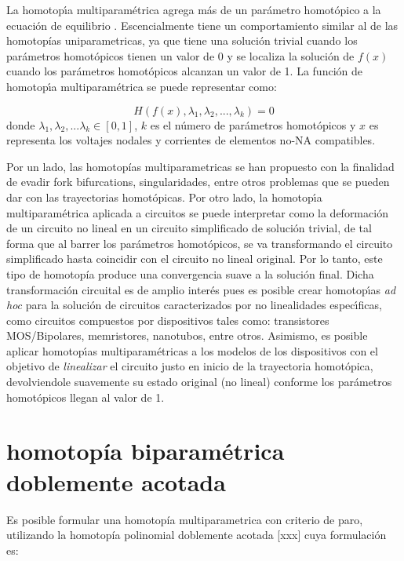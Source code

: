 \documentclass[conference,letterpaper,twocolumn]{IEEEtran}
\begin{document}
La homotop\'{\i}a multiparam\'etrica agrega m\'as de un par\'ametro homot\'opico a la ecuación de equilibrio \cite{homo_DWolfMulti}.
Escencialmente tiene un comportamiento similar al de las homotopías uniparametricas, ya que
tiene una soluci\'on trivial cuando los par\'ametros homotópicos tienen un valor de 0
y se localiza la solución de $f(x)$ cuando los parámetros homotópicos alcanzan un valor de 1.
La funci\'on de homotop\'{\i}a
multiparam\'etrica se puede representar como:

\begin{equation}
{H}({f}({x}),\lambda_1,\lambda_2,...,\lambda_k)=0
\end{equation} 
donde $\lambda_1,\lambda_2,...\lambda_k\in[0,1]$, $k$ es el n\'umero de par\'ametros homot\'opicos
y  $x$ es representa los voltajes nodales y corrientes de elementos no-NA compatibles.


Por un lado, las homotopías multiparametricas \cite{homo_DWolfMulti} se han propuesto con la finalidad
de evadir fork bifurcations, singularidades, entre otros problemas que se pueden dar con las trayectorias
homotópicas. Por otro lado, la homotop\'{\i}a multiparam\'etrica aplicada a circuitos se puede interpretar como la
deformaci\'on de un circuito no lineal en un circuito simplificado de solución trivial,
de tal forma que al barrer los par\'a\-me\-tros homot\'opicos, se va transformando el circuito
simplificado hasta coincidir con el circuito no lineal original.
Por lo tanto, este tipo  de homotopía produce una  convergencia suave
a la soluci\'on final.
Dicha transformación circuital es de amplio inter\'es pues es posible
crear homotop\'{\i}as {\it ad hoc} para la soluci\'on de circuitos caracterizados
por no linealidades espec\'{\i}ficas, como circuitos compuestos por dispositivos tales como:
transistores MOS/Bipolares, memristores, nanotubos, entre otros. Asimismo, es posible aplicar 
homotop\'{\i}as multiparam\'etricas a los modelos
de los dispositivos con el objetivo de {\it linealizar} el circuito justo en inicio de la trayectoria
homotópica, devolviendole suavemente su estado original (no lineal) conforme los parámetros homotópicos llegan
al valor de 1. 

\section{homotopía biparamétrica doblemente acotada}

Es posible formular una homotopía multiparametrica con criterio de paro, utilizando
la homotopía polinomial doblemente acotada [xxx] cuya formulación es:
\end{document}
